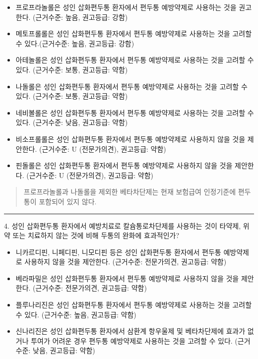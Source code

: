 \documentclass[]{book}
\begin{document}
\begin{itemize}
\item
  프로프라놀롤은 성인 삽화편두통 환자에서 편두통 예방약제로 사용하는 것을 권고한다. (근거수준: 높음, 권고등급: 강함)
\item
  메토프롤롤은 성인 삽화편두통 환자에서 편두통 예방약제로 사용하는 것을 고려할 수 있다.(근거수준: 높음, 권고등급: 강함)
\item
  아테놀롤은 성인 삽화편두통 환자에서 편두통 예방약제로 사용하는 것을 고려할 수 있다. (근거수준: 보통, 권고등급: 약함)
\item
  나돌롤은 성인 삽화편두통 환자에서 편두통 예방약제로 사용하는 것을 고려할 수 있다. (근거수준: 보통, 권고등급: 약함)
\item
  네비볼롤은 성인 삽화편두통 환자에서 편두통 예방약제로 사용하는 것을 고려할 수 있다. (근거수준: 낮음, 권고등급: 약함)
\item
  비소프롤롤은 성인 삽화편두통 환자에서 편두통 예방약제로 사용하지 않을 것을 제안한다. (근거수준: U (전문가의견), 권고등급: 약함)
\item
  핀돌롤은 성인 삽화편두통 환자에서 편두통 예방약제로 사용하지 않을 것을 제안한다. (근거수준: U (전문가의견), 권고등급: 약함)
\end{itemize}

\begin{quote}
프로프라놀롤과 나돌롤을 제외한 베타차단제는 현재 보험급여 인정기준에 편두통이 포함되어 있지 않다.
\end{quote}

\begin{center}\rule{0.5\linewidth}{\linethickness}\end{center}

4. 성인 삽화편두통 환자에서 예방치료로 칼슘통로차단제를 사용하는 것이 타약제, 위약 또는 치료하지 않는 것에 비해 두통의 완화에 효과적인가?

\begin{itemize}
\item
  니카르디핀, 니페디핀, 니모디핀 등은 성인 삽화편두통 환자에서 편두통 예방약제로 사용하지 않을 것을 제안한다. (근거수준: 전문가의견, 권고등급: 약함)
\item
  베라파밀은 성인 삽화편두통 환자에서 편두통 예방약제로 사용하지 않을 것을 제안한다. (근거수준: 전문가의견, 권고등급: 약함)
\item
  플루나리진은 성인 삽화편두통 환자에서 편두통 예방약제로 사용하는 것을 고려할 수 있다. (근거수준: 높음, 권고등급: 약함)
\item
  신나리진은 성인 삽화편두통 환자에서 삼환계 항우울제 및 베타차단제에 효과가 없거나 투여가 어려운 경우 편두통 예방약제로 사용하는 것을 고려할 수 있다. (근거수준: 낮음, 권고등급: 약함)
\end{itemize}
\end{document}
